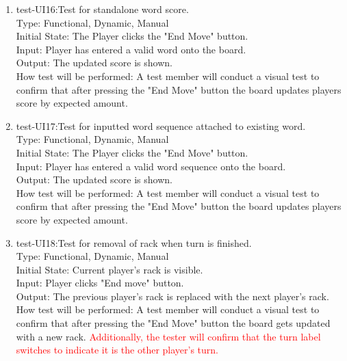\documentclass[12pt, titlepage]{article}
\begin{document}
\begin{enumerate}
    \item{test-UI16:Test for standalone word score.\\} %
    Type: Functional, Dynamic, Manual\\
    Initial State: The Player clicks the "End Move" button.\\
    Input: Player has entered a valid word onto the board. \\
    Output: The updated score is shown. \\
    How test will be performed: A test member will conduct a visual test to confirm that after pressing the "End Move" button the board updates players score by expected amount.\\
    
    \item{test-UI17:Test for inputted word sequence attached to existing word.\\} %
    Type: Functional, Dynamic, Manual\\
    Initial State: The Player clicks the "End Move" button.\\
    Input: Player has entered a valid word sequence onto the board. \\
    Output: The updated score is shown. \\
    How test will be performed: A test member will conduct a visual test to confirm that after pressing the "End Move" button the board updates players score by expected amount.\\
    
    \item{test-UI18:Test for removal of rack when turn is finished.\\} %
    Type: Functional, Dynamic, Manual\\
    Initial State: Current player's rack is visible.\\
    Input: Player clicks "End move" button. \\
    Output: The previous player's rack is replaced with the next player's rack. \\
    How test will be performed: A test member will conduct a visual test to confirm that after pressing the "End Move" button the board gets updated with a new rack. \textcolor{red}{Additionally, the tester will confirm that the turn label switches to indicate it is the other player's turn.}\\
    

\end{enumerate}
\end{document}
